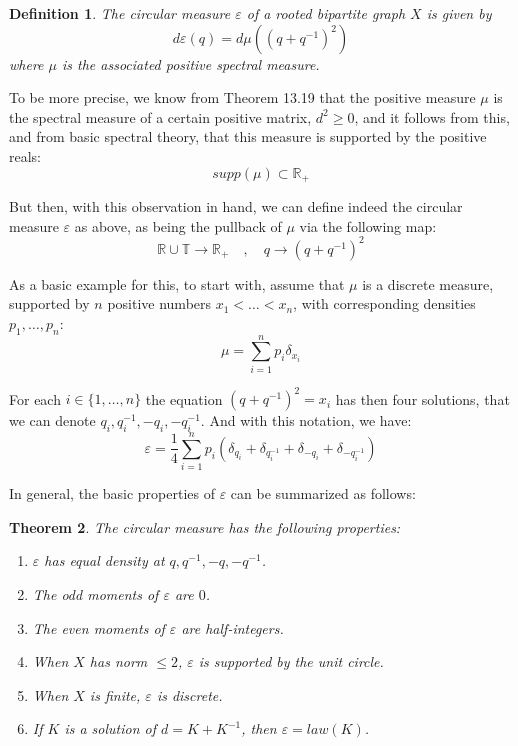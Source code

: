 \documentclass[12pt]{amsbook}
\newtheorem{theorem}{Theorem}[chapter]
\newtheorem{definition}[theorem]{Definition}
\begin{document}
\begin{definition}
The circular measure $\varepsilon$ of a rooted bipartite graph $X$ is given by
$$d\varepsilon(q)=d\mu((q+q^{-1})^2)$$
where $\mu$ is the associated positive spectral measure.
\end{definition}

To be more precise, we know from Theorem 13.19 that the positive measure $\mu$ is the spectral measure of a certain positive matrix, $d^2\geq0$, and it follows from this, and from basic spectral theory, that this measure is supported by the positive reals:
$$supp(\mu)\subset\mathbb R_+$$

But then, with this observation in hand, we can define indeed the circular measure $\varepsilon$ as above, as being the pullback of $\mu$ via the following map:
$$\mathbb R\cup\mathbb T\to\mathbb R_+\quad,\quad 
q\to (q+q^{-1})^2$$

As a basic example for this, to start with, assume that $\mu$ is a discrete measure, supported by $n$ positive numbers $x_1<\ldots<x_n$, with corresponding densities $p_1,\ldots,p_n$:
$$\mu=\sum_{i=1}^n p_i\delta_{x_i}$$

For each $i\in\{1,\ldots,n\}$ the equation $(q+q^{-1})^2=x_i$ has then four solutions, that we can denote $q_i,q_i^{-1},-q_i,-q_i^{-1}$. And with this notation, we have:
$$\varepsilon=\frac{1}{4}\sum_{i=1}^np_i\left(\delta_{q_i}+\delta_{q_i^{-1}}+\delta_{-q_i}+\delta_{-q_i^{-1}}\right)$$

In general, the basic properties of $\varepsilon$ can be summarized as follows:

\begin{theorem}
The circular measure has the following properties:
\begin{enumerate}
\item $\varepsilon$ has equal density at $q,q^{-1},-q,-q^{-1}$.

\item The odd moments of $\varepsilon$ are $0$.

\item The even moments of $\varepsilon$ are half-integers.

\item When $X$ has norm $\leq 2$, $\varepsilon$ is supported by the unit circle.

\item When $X$ is finite, $\varepsilon$ is discrete.

\item If $K$ is a solution of $d=K+K^{-1}$, then $\varepsilon=law(K)$. 
\end{enumerate}
\end{theorem}
\end{document}
